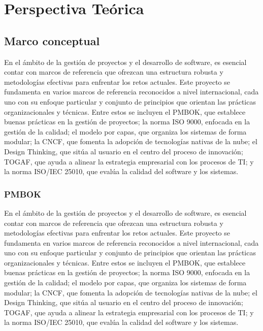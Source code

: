 \part{Perspectiva Teórica}

\chapter*{Marco conceptual}

En el ámbito de la gestión de proyectos y el desarrollo de software, es esencial contar con marcos
de referencia que ofrezcan una estructura robusta y metodologías efectivas para enfrentar los
retos actuales. Este proyecto se fundamenta en varios marcos de referencia reconocidos a nivel
internacional, cada uno con su enfoque particular y conjunto de principios que orientan las
prácticas organizacionales y técnicas. Entre estos se incluyen el PMBOK, que establece buenas
prácticas en la gestión de proyectos; la norma ISO 9000, enfocada en la gestión de la calidad; el
modelo por capas, que organiza los sistemas de forma modular; la CNCF, que fomenta la
adopción de tecnologías nativas de la nube; el Design Thinking, que sitúa al usuario en el centro
del proceso de innovación; TOGAF, que ayuda a alinear la estrategia empresarial con los
procesos de TI; y la norma ISO/IEC 25010, que evalúa la calidad del software y los sistemas.

\section{PMBOK}
En el ámbito de la gestión de proyectos y el desarrollo de software, es esencial contar con marcos
de referencia que ofrezcan una estructura robusta y metodologías efectivas para enfrentar los
retos actuales. Este proyecto se fundamenta en varios marcos de referencia reconocidos a nivel
internacional, cada uno con su enfoque particular y conjunto de principios que orientan las
prácticas organizacionales y técnicas. Entre estos se incluyen el PMBOK, que establece buenas
prácticas en la gestión de proyectos; la norma ISO 9000, enfocada en la gestión de la calidad; el
modelo por capas, que organiza los sistemas de forma modular; la CNCF, que fomenta la
adopción de tecnologías nativas de la nube; el Design Thinking, que sitúa al usuario en el centro
del proceso de innovación; TOGAF, que ayuda a alinear la estrategia empresarial con los
procesos de TI; y la norma ISO/IEC 25010, que evalúa la calidad del software y los sistemas.



